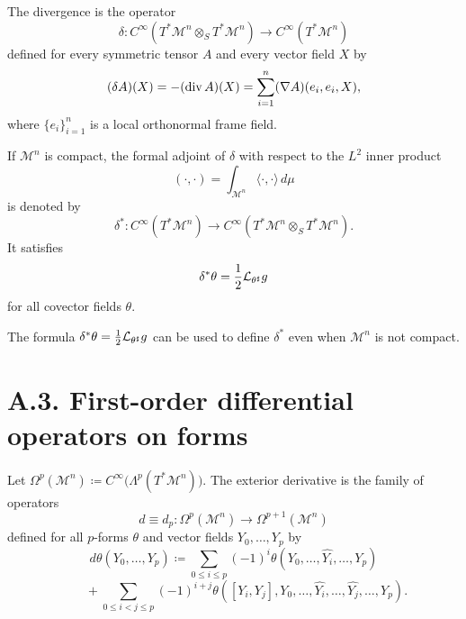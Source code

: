\begin{definition}
\label{appa-def-divergence-operator}
The divergence is the operator
\[
\delta : C^\infty(T^*\mathcal M^n \otimes_S T^*\mathcal M^n)\to C^\infty(T^*\mathcal M^n)
\]
defined for every symmetric tensor \(A\) and every vector field \(X\) by
\[
(\delta A)(X)=-(\operatorname{div} A)(X)=\sum_{i=1}^n (\nabla A)(e_i,e_i,X),
\]
where \(\{e_i\}_{i=1}^n\) is a local orthonormal frame field.
\end{definition}

\begin{definition}
\label{appa-def-formal-adjoint-divergence}
If \(\mathcal M^n\) is compact, the formal adjoint of \(\delta\) with respect to the \(L^2\) inner product
\[
(\cdot,\cdot)=\int_{\mathcal M^n}\langle \cdot,\cdot\rangle\,d\mu
\]
is denoted by
\[
\delta^* : C^\infty(T^*\mathcal M^n)\to C^\infty(T^*\mathcal M^n\otimes_S T^*\mathcal M^n).
\]
It satisfies
\[
\delta^*\theta=\frac12 \mathcal{L}_{\theta^\sharp}g
\]
for all covector fields \(\theta\).
\end{definition}

\begin{remark}
\label{appa-rem-extending-divergence-adjoint}
The formula \(\delta^*\theta=\tfrac12 \mathcal{L}_{\theta^\sharp}g\) can be used to define \(\delta^*\) even when \(\mathcal M^n\) is not compact.
\end{remark}

\section*{A.3. First-order differential operators on forms}

\begin{definition}
\label{appa-def-exterior-derivative}
Let \(\Omega^p(\mathcal M^n)\coloneqq C^\infty\bigl(\Lambda^p(T^*\mathcal M^n)\bigr)\). The exterior derivative is the family of operators
\[
d\equiv d_p:\Omega^p(\mathcal M^n)\to \Omega^{p+1}(\mathcal M^n)
\]
defined for all \(p\)-forms \(\theta\) and vector fields \(Y_0,\ldots,Y_p\) by
\[
d\theta(Y_0,\ldots,Y_p)
\coloneqq \sum_{0\le i\le p}(-1)^i\theta(Y_0,\ldots,\widehat{Y_i},\ldots,Y_p)
\]
\[
\qquad + \sum_{0\le i<j\le p}(-1)^{i+j}\theta([Y_i,Y_j],Y_0,\ldots,\widehat{Y_i},\ldots,\widehat{Y_j},\ldots,Y_p).
\]
\end{definition}

